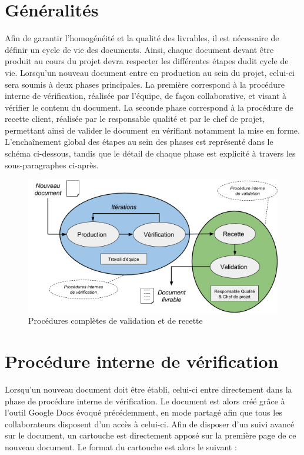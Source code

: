 
\section{Généralités}

Afin de garantir l’homogénéité et la qualité des livrables, il est nécessaire de définir un cycle de vie des documents. Ainsi, chaque document devant être produit au cours du projet devra respecter les différentes étapes dudit cycle de vie. Lorsqu’un nouveau document entre en production au sein du projet, celui-ci sera soumis à deux phases principales. La première correspond à la procédure interne de vérification, réalisée par l’équipe, de façon collaborative, et visant à vérifier le contenu du document. La seconde phase correspond à la procédure de recette client, réalisée par le responsable qualité et par le chef de projet, permettant ainsi de valider le document en vérifiant notamment la mise en forme. L’enchaînement global des étapes au sein des phases est représenté dans le schéma ci-dessous, tandis que le détail de chaque phase est explicité à travers les sous-paragraphes ci-après.

\begin{figure}[H]
    \centering
    \label{fig-valid-recette}
    \includegraphics[scale=0.5]{figures/validation_recette.png}
    \caption{Procédures complètes de validation et de recette}
\end{figure}

\section{Procédure interne de vérification}
    
Lorsqu’un nouveau document doit être établi, celui-ci entre directement dans la phase de procédure interne de vérification. Le document est alors créé grâce à l’outil Google Docs évoqué précédemment, en mode partagé afin que tous les collaborateurs disposent d’un accès à celui-ci. Afin de disposer d’un suivi avancé sur le document, un cartouche est directement apposé sur la première page de ce nouveau document. Le format du cartouche est alors le suivant : \\


